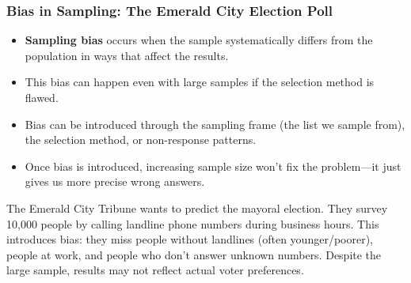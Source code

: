 \documentclass{beamer}
\begin{document}
	\begin{frame}
		\frametitle{Bias in Sampling: The Emerald City Election Poll}
		
		\begin{itemize}
			\item \textbf{Sampling bias} occurs when the sample systematically differs from the population in ways that affect the results.
			\item This bias can happen even with large samples if the selection method is flawed.
			\item Bias can be introduced through the sampling frame (the list we sample from), the selection method, or non-response patterns.
			\item Once bias is introduced, increasing sample size won't fix the problem—it just gives us more precise wrong answers.
		\end{itemize}
		
		\begin{example}
			The Emerald City Tribune wants to predict the mayoral election. They survey 10,000 people by calling landline phone numbers during business hours. This introduces bias: they miss people without landlines (often younger/poorer), people at work, and people who don't answer unknown numbers. Despite the large sample, results may not reflect actual voter preferences.
		\end{example}
		
	\end{frame}
	
\end{document}
